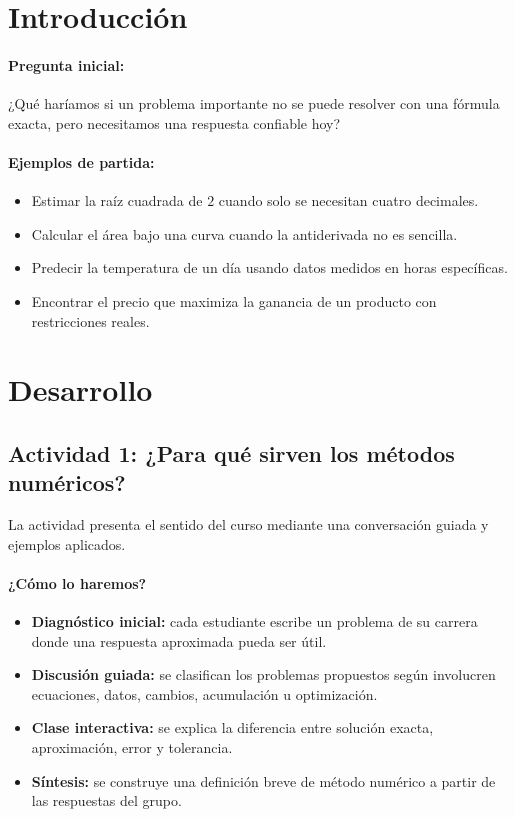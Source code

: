 \documentclass[a4,11pt]{aleph-notas}
\begin{document}
\section*{Introducción}

\paragraph{Pregunta inicial:} 
¿Qué haríamos si un problema importante no se puede resolver con una fórmula exacta, pero necesitamos una respuesta confiable hoy?

\paragraph{Ejemplos de partida:}
\begin{itemize}[leftmargin=*]
    \item Estimar la raíz cuadrada de $2$ cuando solo se necesitan cuatro decimales.
    \item Calcular el área bajo una curva cuando la antiderivada no es sencilla.
    \item Predecir la temperatura de un día usando datos medidos en horas específicas.
    \item Encontrar el precio que maximiza la ganancia de un producto con restricciones reales.
\end{itemize}

\section*{Desarrollo}

\subsection*{Actividad 1: ¿Para qué sirven los métodos numéricos?}

La actividad presenta el sentido del curso mediante una conversación guiada y ejemplos aplicados.

\paragraph{¿Cómo lo haremos?}  
\begin{itemize}[leftmargin=*]
    \item \textbf{Diagnóstico inicial:} cada estudiante escribe un problema de su carrera donde una respuesta aproximada pueda ser útil.
    \item \textbf{Discusión guiada:} se clasifican los problemas propuestos según involucren ecuaciones, datos, cambios, acumulación u optimización.
    \item \textbf{Clase interactiva:} se explica la diferencia entre solución exacta, aproximación, error y tolerancia.
    \item \textbf{Síntesis:} se construye una definición breve de método numérico a partir de las respuestas del grupo.
\end{itemize}
\end{document}
